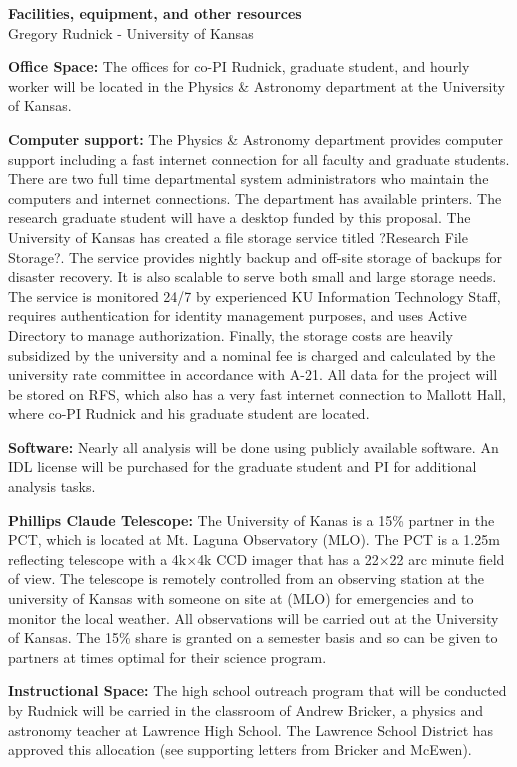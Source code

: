 \documentclass[11pt,preprint]{aastex}
\begin{document}

\noindent
{\Large\bf Facilities, equipment, and other resources}\\
{\Large Gregory Rudnick - University of Kansas}


{\bf Office Space:} The offices for co-PI Rudnick, graduate student,
and hourly worker will be located in the Physics \& Astronomy
department at the University of Kansas.

{\bf Computer support:} The Physics \& Astronomy department provides
computer support including a fast internet connection for all faculty
and graduate students.  There are two full time departmental system
administrators who maintain the computers and internet connections.
The department has available printers.  The research graduate student
will have a desktop funded by this proposal.   The University of Kansas has created a file storage service titled ?Research File Storage?.  The service provides nightly backup and off-site storage of backups for disaster recovery.  It is also scalable to serve both small and large storage needs.  The service is monitored 24/7 by experienced KU Information Technology Staff, requires authentication for identity management purposes, and uses Active Directory to manage authorization.  Finally, the storage costs are heavily subsidized by the university and a nominal fee is charged and calculated by the university rate committee in accordance with A-21.  All data for the project will be stored on RFS, which also has a very fast internet connection to Mallott Hall, where co-PI Rudnick and his graduate student are located.

{\bf Software:} Nearly all analysis will be done using publicly
available software.  An IDL license will be purchased for the graduate
student and PI for additional analysis tasks.

{\bf Phillips Claude Telescope:}  The University of Kanas is a 15\% partner in the PCT, which is located at Mt. Laguna Observatory (MLO).  The PCT is a 1.25m reflecting telescope with a 4k$\times$4k CCD imager that has a 22$\times$22 arc minute field of view.  The telescope is remotely controlled from an observing station at the university of Kansas with someone on site at (MLO) for emergencies and to monitor the local weather.  All observations will be carried out at the University of Kansas.  The 15\% share is granted on a semester basis and so can be given to partners at times optimal for their science program.  


{\bf Instructional Space:} The high school outreach program that will
be conducted by Rudnick will be carried in the classroom of Andrew
Bricker, a physics and astronomy teacher at Lawrence High School.  The
Lawrence School District has approved this allocation (see supporting
letters from Bricker and McEwen).
\end{document}
